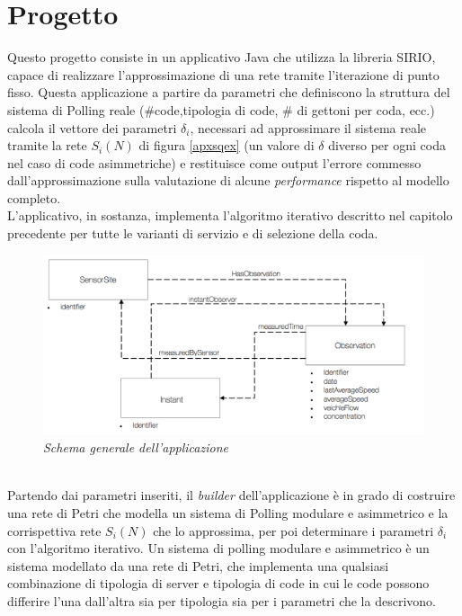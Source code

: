 \documentclass[12pt,a4paper,italian]{article}
\begin{document}
\section{Progetto}
\thispagestyle{plain}
Questo progetto consiste in un applicativo Java che utilizza la libreria SIRIO, capace di realizzare l'approssimazione di una rete tramite l'iterazione di punto fisso. Questa applicazione a partire da parametri che definiscono la struttura del sistema di Polling reale (\#code,tipologia di code, \# di gettoni per coda, ecc.) calcola il vettore dei parametri $\delta_i$, necessari ad approssimare il sistema reale tramite la rete $S_i(N)$ di figura \ref{apxsqex} (un valore di $\delta$ diverso per ogni coda nel caso di code asimmetriche) e restituisce come output l'errore commesso dall'approssimazione sulla valutazione di alcune \emph{performance} rispetto al modello completo.\\ L'applicativo, in sostanza, implementa l'algoritmo iterativo descritto nel capitolo precedente per tutte le varianti di servizio e di selezione della coda.
\newline
\begin{figure}[ht!]
	\centering
	\includegraphics[width=13cm]{img/schema.png}
	\caption{\emph{Schema generale dell'applicazione}}
\end{figure}
\ \\
\newline
Partendo dai parametri inseriti, il \emph{builder} dell'applicazione è in grado di costruire una rete di Petri che modella un sistema di Polling modulare e asimmetrico e la corrispettiva rete $S_i(N)$ che lo approssima, per poi determinare i parametri $\delta_i$ con l'algoritmo iterativo. Un sistema di polling modulare e asimmetrico  è un sistema modellato da una rete di Petri, che implementa una qualsiasi combinazione di tipologia di server e tipologia di code in cui le code possono differire l'una dall'altra sia per tipologia sia per i parametri che la descrivono.\\
\end{document}

